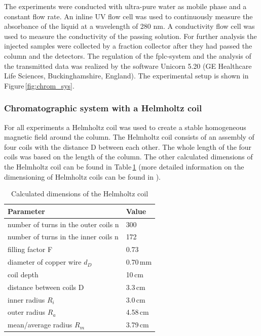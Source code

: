 The experiments were conducted with ultra-pure water as mobile phase and a constant flow rate. An inline UV flow cell was used to continuously measure the absorbance of the liquid at a wavelength of 280 nm. A conductivity flow cell was used to measure the conductivity of the passing solution. For further analysis the injected samples were collected by a fraction collector after they had passed the column and the detectors. The regulation of the \gls{fplc}-system and the analysis of the transmitted data was realized by the software Unicorn 5.20 (GE Healthcare Life Sciences, Buckinghamshire, England). The experimental setup is shown in Figure\,\ref{fig:chrom_sys}.
\FloatBarrier

\subsubsection{Chromatographic system with a Helmholtz coil}
\label{subsubsec:helm_coil}
For all experiments a Helmholtz coil was used to create a stable homogeneous magnetic field around the column. The Helmholtz coil consists of an assembly of four coils with the distance D between each other. The whole length of the four coils was based on the length of the column. The other calculated dimensions of the Helmholtz coil can be found in Table\,\ref{table:Helmholtz_coil} (more detailed information on the dimensioning of Helmholtz coils can be found in \cite{wotruba1968verbesserung,wotruba1969massive,heller1955erzeugung}). 

\begin{table}[H]
\centering
\caption[Dimensions of the Helmholtz coil]{Calculated dimensions of the Helmholtz coil}
\label{table:Helmholtz_coil}
\begin{tabular}{ll}\hline
Parameter &  Value \\
\hline\hline
 number of turns in the outer coils n & 300 \\
 number of turns in the inner coils n & 172 \\
 filling factor F & 0.73\\
 diameter of copper wire $d_{D}$ & 0.70\,mm\\
 coil depth & 10\,cm\\
 distance between coils D & 3.3\,cm \\
 inner radius $R_{i}$ & 3.0\,cm\\ 
 outer radius $R_{a}$ & 4.58\,cm\\
 mean/average radius $R_{m}$ & 3.79\,cm\\
 \hline
\end{tabular}
\end{table}

